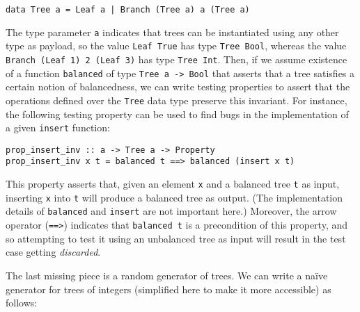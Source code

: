 \documentclass[sigconf,review,anonymous]{acmart}
\newcommand{\quickcheck}{\textit{QuickCheck}\xspace}
\begin{document}
\begin{verbatim}
data Tree a = Leaf a | Branch (Tree a) a (Tree a)
\end{verbatim}

\noindent The type parameter \texttt{a} indicates that trees can be instantiated
using any other type as payload, so the value \texttt{Leaf True} has type
\texttt{Tree Bool}, whereas the value \texttt{Branch (Leaf 1) 2 (Leaf 3)} has
type \texttt{Tree Int}.
%
%
%
%
Then, if we assume existence of a function \texttt{balanced} of type
\texttt{Tree a -> Bool} that asserts that a tree satisfies a certain notion of
balancedness, we can write testing properties to assert that the operations
defined over the \texttt{Tree} data type preserve this invariant.
%
For instance, the following testing property can be used to find bugs in the
implementation of a given \texttt{insert} function:

\begin{verbatim}
prop_insert_inv :: a -> Tree a -> Property
prop_insert_inv x t = balanced t ==> balanced (insert x t)
\end{verbatim}

\noindent This property asserts that, given an element \texttt{x} and a balanced
tree \texttt{t} as input, inserting \texttt{x} into \texttt{t} will produce a
balanced tree as output.
%
(The implementation details of \texttt{balanced} and \texttt{insert} are not
important here.)
%
Moreover, the arrow operator (\texttt{==>}) indicates that \texttt{balanced t}
is a precondition of this property, and so attempting to test it using an
unbalanced tree as input will result in the test case getting \emph{discarded}.


The last missing piece is a random generator of trees.
%
We can write a na\"ive generator for trees of integers (simplified here to make it
more accessible) as follows:
\end{document}
